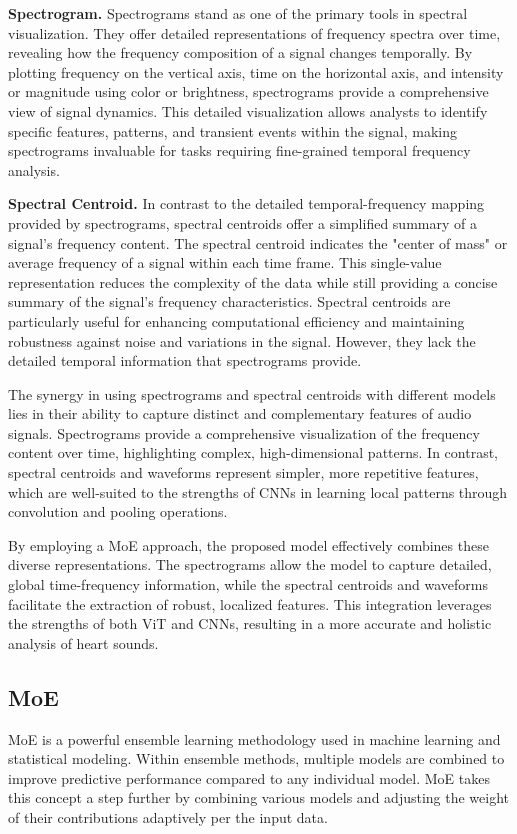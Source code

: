 \textbf{Spectrogram.}
Spectrograms stand as one of the primary tools in spectral visualization. They offer detailed representations of frequency spectra over time, revealing how the frequency composition of a signal changes temporally. By plotting frequency on the vertical axis, time on the horizontal axis, and intensity or magnitude using color or brightness, spectrograms provide a comprehensive view of signal dynamics. This detailed visualization allows analysts to identify specific features, patterns, and transient events within the signal, making spectrograms invaluable for tasks requiring fine-grained temporal frequency analysis.

\textbf{Spectral Centroid.}
In contrast to the detailed temporal-frequency mapping provided by spectrograms, spectral centroids offer a simplified summary of a signal's frequency content. The spectral centroid indicates the "center of mass" or average frequency of a signal within each time frame. This single-value representation reduces the complexity of the data while still providing a concise summary of the signal’s frequency characteristics. Spectral centroids are particularly useful for enhancing computational efficiency and maintaining robustness against noise and variations in the signal. However, they lack the detailed temporal information that spectrograms provide.

The synergy in using spectrograms and spectral centroids with different models lies in their ability to capture distinct and complementary features of audio signals. Spectrograms provide a comprehensive visualization of the frequency content over time, highlighting complex, high-dimensional patterns. In contrast, spectral centroids and waveforms represent simpler, more repetitive features, which are well-suited to the strengths of CNNs in learning local patterns through convolution and pooling operations.

By employing a MoE approach, the proposed model effectively combines these diverse representations. The spectrograms allow the model to capture detailed, global time-frequency information, while the spectral centroids and waveforms facilitate the extraction of robust, localized features. This integration leverages the strengths of both ViT and CNNs, resulting in a more accurate and holistic analysis of heart sounds.

\subsection{MoE}
MoE is a powerful ensemble learning methodology used in machine learning and statistical modeling. Within ensemble methods, multiple models are combined to improve predictive performance compared to any individual model. MoE takes this concept a step further by combining various models and adjusting the weight of their contributions adaptively per the input data.

